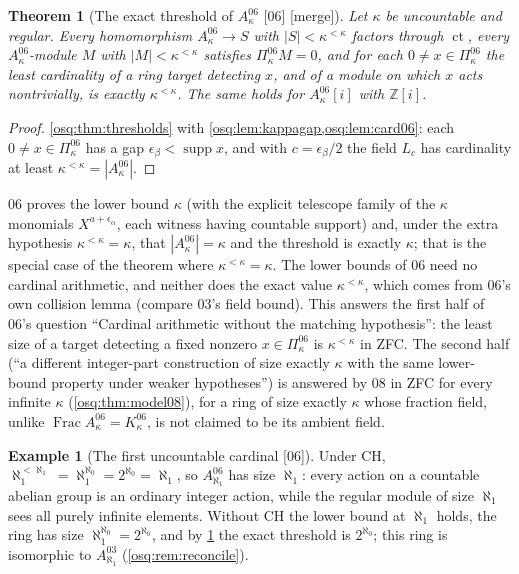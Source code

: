 \documentclass[11pt,letterpaper]{article}
\numberwithin{equation}{section}
\newtheorem{theorem}{Theorem}[section]
\theoremstyle{definition}
\newtheorem{example}[example]{Example}
\theoremstyle{remark}
\theoremstyle{plain}
\newcommand{\Z}{\mathbb Z}
\newcommand{\ct}{\operatorname{ct}}
\newcommand{\supp}{\operatorname{supp}}
\newcommand{\Frac}{\operatorname{Frac}}
\newcommand{\src}[1]{\textup{\textsf{[#1]}}}
\newcommand{\merge}{\textup{\textsf{[merge]}}}
\begin{document}
\begin{theorem}[The exact threshold of $A^{06}_\kappa$ \src{06} \merge]\label{osq:thm:model06}
Let $\kappa$ be uncountable and regular. Every homomorphism $A^{06}_\kappa\to S$ with
$|S|<\kappa^{<\kappa}$ factors through $\ct$, every $A^{06}_\kappa$-module $M$ with $|M|<\kappa^{<\kappa}$
satisfies $\Pi^{06}_\kappa M=0$, and for each $0\ne x\in\Pi^{06}_\kappa$ the least cardinality of a ring
target detecting $x$, and of a module on which $x$ acts nontrivially, is exactly $\kappa^{<\kappa}$. The
same holds for $A^{06}_\kappa[i]$ with $\Z[i]$.
\end{theorem}
\begin{proof}
\cref{osq:thm:thresholds} with \cref{osq:lem:kappagap,osq:lem:card06}: each $0\ne x\in\Pi^{06}_\kappa$ has a
gap $\epsilon_\beta<\supp x$, and with $c=\epsilon_\beta/2$ the field $L_c$ has cardinality at least
$\kappa^{<\kappa}=|A^{06}_\kappa|$.
\end{proof}

06 proves the lower bound $\kappa$ (with the explicit telescope family of the $\kappa$ monomials
$X^{a+\epsilon_\alpha}$, each witness having countable support) and, under the extra hypothesis
$\kappa^{<\kappa}=\kappa$, that $|A^{06}_\kappa|=\kappa$ and the threshold is exactly $\kappa$; that is
the special case of the theorem where $\kappa^{<\kappa}=\kappa$. The lower bounds of 06 need no cardinal
arithmetic, and neither does the exact value $\kappa^{<\kappa}$, which comes from 06's own collision lemma
(compare 03's field bound). This answers the first half of 06's question ``Cardinal arithmetic without the
matching hypothesis'': the least size of a target detecting a fixed nonzero $x\in\Pi^{06}_\kappa$ is
$\kappa^{<\kappa}$ in ZFC. The second half (``a different integer-part construction of size exactly
$\kappa$ with the same lower-bound property under weaker hypotheses'') is answered by 08 in ZFC for every
infinite $\kappa$ (\cref{osq:thm:model08}), for a ring of size exactly $\kappa$ whose fraction field,
unlike $\Frac A^{06}_\kappa=K^{06}_\kappa$, is not claimed to be its ambient field.

\begin{example}[The first uncountable cardinal \src{06}]\label{osq:ex:CH}
Under CH, $\aleph_1^{<\aleph_1}=\aleph_1^{\aleph_0}=2^{\aleph_0}=\aleph_1$, so $A^{06}_{\aleph_1}$ has
size $\aleph_1$: every action on a countable abelian group is an ordinary integer action, while the regular
module of size $\aleph_1$ sees all purely infinite elements. Without CH the lower bound at $\aleph_1$ holds,
the ring has size $\aleph_1^{\aleph_0}=2^{\aleph_0}$, and by \cref{osq:thm:model06} the exact threshold is
$2^{\aleph_0}$; this ring is isomorphic to $A^{03}_{\aleph_1}$ (\cref{osq:rem:reconcile}).
\end{example}
\end{document}
